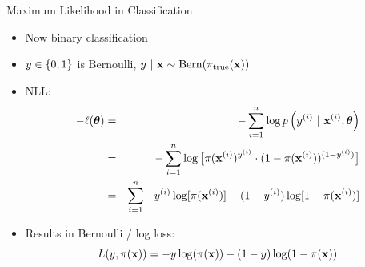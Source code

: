 \documentclass[11pt,compress,t,notes=noshow, xcolor=table]{beamer}
\begin{document}
\begin{vbframe}{Maximum Likelihood in Classification}


\begin{itemize}

\item Now binary classification
\item $y \in \{0, 1\}$ is Bernoulli, $y ~|~ \mathbf{x} \sim \text{Bern}(\pi_\text{true}(\mathbf{x}))$
\item  NLL:
\begin{eqnarray*}
- \ell(\bm{\theta}) &=& -\sum\limits_{i=1}^n \log p\left(y^{(i)} ~|~\mathbf{x}^{(i)}, \bm{\theta}\right) \\ 
&=& - \sum\limits_{i=1}^n \log \big[\pi(\mathbf{x}^{(i)})^{y^{(i)}} \cdot (1 - \pi(\mathbf{x}^{(i)}))^{(1 - y^{(i)})} \big]\\
&=& \sum\limits_{i=1}^n -y^{(i)} \log[\pi(\mathbf{x}^{(i)})] - (1-y^{(i)}) \log [1 - \pi(\mathbf{x}^{(i)})]
\end{eqnarray*}
\item Results in Bernoulli / log loss:
$$
  L(y, \pi(\mathbf{x})) = -y\log(\pi(\mathbf{x}))-(1-y)\log(1-\pi(\mathbf{x}))
$$


\end{itemize}

\end{vbframe}
\end{document}
